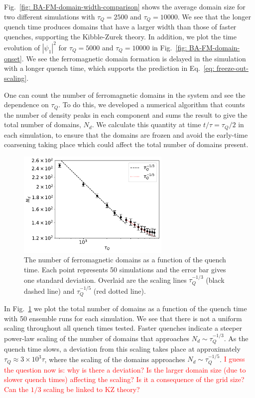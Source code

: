 Fig.~\ref{fig: BA-FM-domain-width-comparison} shows the average domain size
for two different simulations with \(\tau_Q=2500\) and \(\tau_Q=10000\).
We see that the longer quench time produces domains that have a
larger width than those of faster quenches, supporting the Kibble-Zurek theory.
In addition, we plot the time evolution of \(|\psi_1|^2\) for \(\tau_Q=5000\) and
\(\tau_Q=10000\) in Fig.~\ref{fig: BA-FM-domain-onset}.
We see the ferromagnetic domain formation is delayed in the simulation
with a longer quench time, which supports the prediction in
Eq.~\eqref{eq: freeze-out-scaling}.

One can count the number of ferromagnetic domains in the system and see the
dependence on \( \tau_Q \).
To do this, we developed a numerical algorithm that counts the number of
density peaks in each component and sums the result to give the total number of
domains, \(N_d\).
We calculate this quantity at time \(t/\tau=\tau_Q/2\) in each simulation, to
ensure that the domains are frozen and avoid the early-time coarsening
taking place which could affect the total number of domains present.
\begin{figure}
    \centering
    \includegraphics[width=0.65\textwidth]{gfx/ch-spin1/FM_domains_scaling.pdf}
    \caption{The number of ferromagnetic domains as a function of the
    quench time. Each point represents 50 simulations and the
    error bar gives one standard deviation. Overlaid are the scaling lines
    \(\tau_Q^{-1/3}\) (black dashed line) and \(\tau_Q^{-1/5}\)
    (red dotted line).\label{fig: FM-domains-scaling}}
\end{figure}
In Fig.~\ref{fig: FM-domains-scaling} we plot the total number of domains
as a function of the quench time with 50 ensemble runs for each simulation.
We see that there is not a uniform scaling throughout all quench times tested.
Faster quenches indicate a steeper power-law scaling of the number of domains
that approaches \(N_d\sim\tau_Q^{-1/3}\).
As the quench time slows, a deviation from this scaling takes place at
approximately \(\tau_Q\approx 3\times10^3\tau \), where the scaling of the
domains approaches \(N_d\sim\tau_Q^{-1/5}\).
\textcolor{red}{I guess the question now is: why is there a deviation?
Is the larger domain size (due to slower quench times) affecting the scaling?
Is it a consequence of the grid size? Can the \(1/3\) scaling be linked to KZ
theory?}

